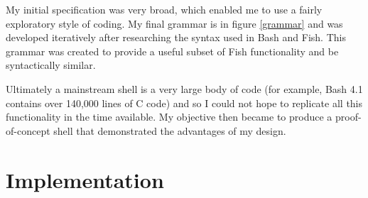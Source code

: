\documentclass[12pt,twoside,notitlepage]{report}
\begin{document}
My initial specification was very broad, which enabled me to use a
fairly exploratory style of coding. My final grammar is in figure
\ref{grammar} and was developed iteratively after researching the
syntax used in Bash and Fish. This grammar was created to provide a
useful subset of Fish functionality and be syntactically similar.

Ultimately a mainstream shell is a very large body of code (for
example, Bash 4.1 contains over 140,000 lines of C
code\footnotemark[1]) and so I could not hope to replicate all this
functionality in the time available. My objective then became to
produce a proof-of-concept shell that demonstrated the advantages of
my design.







\cleardoublepage

\chapter{Implementation}
\end{document}
